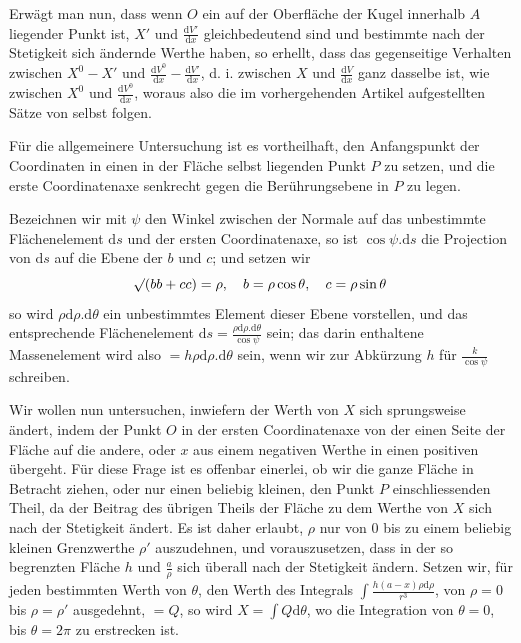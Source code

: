 Erwägt man nun, dass wenn $O$ ein auf der Oberfläche der Kugel innerhalb $A$ liegender Punkt ist, $X'$ und $\frac{\mathrm{d}V'}{\mathrm{d}x}$ gleichbedeutend sind und bestimmte nach der Stetigkeit sich ändernde Werthe haben, so erhellt, dass das gegenseitige Verhalten zwischen $X^0-X'$ und $\frac{\mathrm{d}V^0}{\mathrm{d}x}-\frac{\mathrm{d}V'}{\mathrm{d}x}$, d. i. zwischen $X$ und $\frac{\mathrm{d}V}{\mathrm{d}x}$ ganz dasselbe ist, wie zwischen $X^0$ und $\frac{\mathrm{d}V^0}{\mathrm{d}x}$, woraus also die im vorhergehenden Artikel aufgestellten Sätze von selbst folgen.

Für die allgemeinere Untersuchung ist es vortheilhaft, den Anfangspunkt der Coordinaten in einen in der Fläche selbst liegenden Punkt $P$ zu setzen, und die erste Coordinatenaxe senkrecht gegen die Berührungsebene in $P$ zu legen.
%

Bezeichnen wir mit $\psi$ den Winkel zwischen der Normale auf das unbestimmte Flächenelement $\mathrm{d}s$ und der ersten Coordinatenaxe, so ist $\cos\psi.\mathrm{d}s$ die Projection von $\mathrm{d}s$ auf die Ebene der $b$ und $c$; und setzen wir
\[
\mathord{{}^{}\!\surd}(bb+cc)=\rho,\quad b=\rho\cos\theta,\quad c=\rho\sin\theta
\]
so wird $\rho\mathrm{d}\rho.\mathrm{d}\theta$ ein unbestimmtes Element dieser Ebene vorstellen, und das entsprechende Flächenelement $\mathrm{d}s=\frac{\rho\mathrm{d}\rho.\mathrm{d}\theta}{\cos\psi}$ sein; das darin enthaltene Massenelement wird also $=h\rho\mathrm{d}\rho.\mathrm{d}\theta$ sein, wenn wir zur Abkürzung $h$ für $\frac{k}{\cos\psi}$ schreiben.

Wir wollen nun untersuchen, inwiefern der Werth von $X$ sich sprungsweise ändert, indem der Punkt $O$ in der ersten Coordinatenaxe von der einen Seite der Fläche auf die andere, oder $x$ aus einem negativen Werthe in einen positiven übergeht. Für diese Frage ist es offenbar einerlei, ob wir die ganze Fläche in Betracht ziehen, oder nur einen beliebig kleinen, den Punkt $P$ einschliessenden Theil, da der Beitrag des übrigen Theils der Fläche zu dem Werthe von $X$ sich nach der Stetigkeit ändert. Es ist daher erlaubt, $\rho$ nur von $0$ bis zu einem beliebig kleinen Grenzwerthe $\rho'$ auszudehnen, und vorauszusetzen, dass in der so begrenzten Fläche $h$ und $\frac{a}{\rho}$ sich überall nach der Stetigkeit ändern. Setzen wir, für jeden bestimmten Werth von $\theta$, den Werth des Integrals $\int\frac{h(a-x)\rho\mathrm{d}\rho}{r^3}$, von $\rho=0$ bis $\rho=\rho'$ ausgedehnt, $=Q$, so wird $X=\int Q\mathrm{d}\theta$, wo die Integration von $\theta=0$, bis $\theta=2\pi$ zu erstrecken ist.

